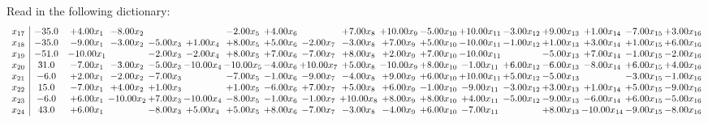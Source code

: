 \documentclass[9pt]{article}
\begin{document}
Read in the following dictionary:
\[\begin{array}{c| c c@{\hskip 2pt} c@{\hskip 2pt} c@{\hskip 2pt} c@{\hskip 2pt} c@{\hskip 2pt} c@{\hskip 2pt} c@{\hskip 2pt} c@{\hskip 2pt} c@{\hskip 2pt} c@{\hskip 2pt} c@{\hskip 2pt} c@{\hskip 2pt} c@{\hskip 2pt} c@{\hskip 2pt} c@{\hskip 2pt} c@{\hskip 2pt} }
 x_{17}   &  -35.0 & +  4.00 x_{1} & -8.00 x_{2} &    &   & -2.00 x_{5} & +  4.00 x_{6} &   & +  7.00 x_{8} & + 10.00 x_{9} & -5.00 x_{10} & + 10.00 x_{11} & -3.00 x_{12} & +  9.00 x_{13} & +  1.00 x_{14} & -7.00 x_{15} & +  3.00 x_{16}\\
 x_{18}   &  -35.0 & -9.00 x_{1} & -3.00 x_{2} & -5.00 x_{3} & +  1.00 x_{4} & +  8.00 x_{5} & +  5.00 x_{6} & -2.00 x_{7} & -3.00 x_{8} & +  7.00 x_{9} & +  5.00 x_{10} & -10.00 x_{11} & -1.00 x_{12} & +  1.00 x_{13} & +  3.00 x_{14} & +  1.00 x_{15} & +  6.00 x_{16}\\
 x_{19}   &  -51.0 & -10.00 x_{1} &   & -2.00 x_{3} & -2.00 x_{4} & +  8.00 x_{5} & +  7.00 x_{6} & -7.00 x_{7} & +  8.00 x_{8} & +  2.00 x_{9} & +  7.00 x_{10} & -10.00 x_{11} &   & -5.00 x_{13} & +  7.00 x_{14} & -1.00 x_{15} & -2.00 x_{16}\\
 x_{20}   &  31.0 & -7.00 x_{1} & -3.00 x_{2} & -5.00 x_{3} & -10.00 x_{4} & -10.00 x_{5} & -4.00 x_{6} & + 10.00 x_{7} & +  5.00 x_{8} & -10.00 x_{9} & +  8.00 x_{10} & -1.00 x_{11} & +  6.00 x_{12} & -6.00 x_{13} & -8.00 x_{14} & +  6.00 x_{15} & +  4.00 x_{16}\\
 x_{21}   &  -6.0 & +  2.00 x_{1} & -2.00 x_{2} & -7.00 x_{3} &   & -7.00 x_{5} & -1.00 x_{6} & -9.00 x_{7} & -4.00 x_{8} & +  9.00 x_{9} & +  6.00 x_{10} & + 10.00 x_{11} & +  5.00 x_{12} & -5.00 x_{13} &   & -3.00 x_{15} & -1.00 x_{16}\\
 x_{22}   &  15.0 & -7.00 x_{1} & +  4.00 x_{2} & +  1.00 x_{3} &   & +  1.00 x_{5} & -6.00 x_{6} & +  7.00 x_{7} & +  5.00 x_{8} & +  6.00 x_{9} & -1.00 x_{10} & -9.00 x_{11} & -3.00 x_{12} & +  3.00 x_{13} & +  1.00 x_{14} & +  5.00 x_{15} & -9.00 x_{16}\\
 x_{23}   &  -6.0 & +  6.00 x_{1} & -10.00 x_{2} & +  7.00 x_{3} & -10.00 x_{4} & -8.00 x_{5} & -1.00 x_{6} & -1.00 x_{7} & + 10.00 x_{8} & +  8.00 x_{9} & +  8.00 x_{10} & +  4.00 x_{11} & -5.00 x_{12} & -9.00 x_{13} & -6.00 x_{14} & +  6.00 x_{15} & -5.00 x_{16}\\
 x_{24}   &  43.0 & +  6.00 x_{1} &   & -8.00 x_{3} & +  5.00 x_{4} & +  5.00 x_{5} & +  8.00 x_{6} & -7.00 x_{7} & -3.00 x_{8} & -4.00 x_{9} & +  6.00 x_{10} & -7.00 x_{11} &   & +  8.00 x_{13} & -10.00 x_{14} & -9.00 x_{15} & -8.00 x_{16}\\

\end{array}\]
\end{document}
